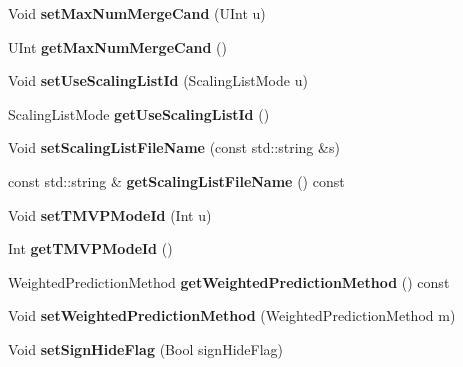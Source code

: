 \begin{DoxyCompactItemize}
Void {\bfseries set\+Max\+Num\+Merge\+Cand} (U\+Int u)
\item 
\mbox{\label{class_t_enc_cfg_a510b9333a551a455ac75c900e32a1ec1}} 
U\+Int {\bfseries get\+Max\+Num\+Merge\+Cand} ()
\item 
\mbox{\label{class_t_enc_cfg_a5ee2eb22ac8a54ec71d7b02258c7814f}} 
Void {\bfseries set\+Use\+Scaling\+List\+Id} (Scaling\+List\+Mode u)
\item 
\mbox{\label{class_t_enc_cfg_a17634008ea8e40cb10213cd3237a208c}} 
Scaling\+List\+Mode {\bfseries get\+Use\+Scaling\+List\+Id} ()
\item 
\mbox{\label{class_t_enc_cfg_ae52d3177970c58c1aafab227089bb1ca}} 
Void {\bfseries set\+Scaling\+List\+File\+Name} (const std\+::string \&s)
\item 
\mbox{\label{class_t_enc_cfg_a65ceeb0d4f04327a492556470b4b1d3d}} 
const std\+::string \& {\bfseries get\+Scaling\+List\+File\+Name} () const
\item 
\mbox{\label{class_t_enc_cfg_a892d6528bac5171b15a4b53191158bfd}} 
Void {\bfseries set\+T\+M\+V\+P\+Mode\+Id} (Int u)
\item 
\mbox{\label{class_t_enc_cfg_aa70c008015769c5548ed492633da1932}} 
Int {\bfseries get\+T\+M\+V\+P\+Mode\+Id} ()
\item 
\mbox{\label{class_t_enc_cfg_ad3ef68db447c3708a800a3ceb9f843b4}} 
Weighted\+Prediction\+Method {\bfseries get\+Weighted\+Prediction\+Method} () const
\item 
\mbox{\label{class_t_enc_cfg_ab864fc649a9e683258d808c1e2860c00}} 
Void {\bfseries set\+Weighted\+Prediction\+Method} (Weighted\+Prediction\+Method m)
\item 
\mbox{\label{class_t_enc_cfg_a384c1b4d2a6a5ee06e5ddfb50fe26633}} 
Void {\bfseries set\+Sign\+Hide\+Flag} (Bool sign\+Hide\+Flag)
\item 
\mbox{\label{class_t_enc_cfg_a7edc561035a3df7e14b24ec961bd7338}} 

\end{DoxyCompactItemize}

